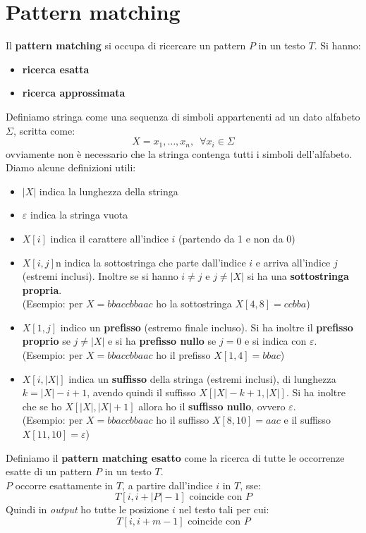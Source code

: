 \chapter{Pattern matching}
Il \textbf{pattern matching} si occupa di ricercare un pattern $P$ in un testo
$T$. Si hanno:
\begin{itemize}
  \item \textbf{ricerca esatta}
  \item \textbf{ricerca approssimata}
\end{itemize}
\begin{definizione}
  Definiamo stringa come una sequenza di simboli appartenenti ad un dato
  alfabeto $\Sigma$, scritta come:
  \[X=x_1,\ldots,x_n,\,\,\,\forall x_i\in \Sigma\]
  ovviamente non è necessario che la stringa contenga tutti i simboli
  dell'alfabeto.\\
  Diamo alcune definizioni utili:
  \begin{itemize}
    \item $|X|$ indica la lunghezza della stringa
    \item $\varepsilon$ indica la stringa vuota
    \item $X[i]$ indica il carattere all'indice $i$ (partendo da 1 e non da 0)
    \item $X[i,j]$n indica la sottostringa che parte dall'indice $i$ e arriva
    all'indice $j$ (estremi inclusi). Inoltre se si hanno $i\neq j$ e $j\neq
    |X|$ si ha una \textbf{sottostringa propria}.\\
    (Esempio: per $X=bbaccbbaac$ ho la sottostringa $X[4,8]=ccbba$)
    \item $X[1,j]$ indico un \textbf{prefisso} (estremo finale incluso). Si ha
    inoltre il \textbf{prefisso proprio} se $j\neq |X|$ e si ha \textbf{prefisso
      nullo} se $j=0$ e si indica con $\varepsilon$.\\
    (Esempio: per $X=bbaccbbaac$ ho il prefisso $X[1,4]=bbac$)
    \item $X[i,|X|]$ indica un \textbf{suffisso} della stringa (estremi
    inclusi), di lunghezza $k=|X|-i+1$, avendo quindi il suffisso
    $X[|X|-k+1,|X|]$. Si ha inoltre che se ho $X[|X|,|X|+1]$ 
    allora ho il \textbf{suffisso nullo}, ovvero $\varepsilon$.\\
    (Esempio: per $X=bbaccbbaac$ ho il suffisso $X[8,10]=aac$ e il suffisso
    $X[11,10]=\varepsilon$)
    
\end{itemize} 
\end{definizione}
\begin{definizione}
  Definiamo il \textbf{pattern matching esatto} come la ricerca di tutte le
  occorrenze esatte di un pattern $P$ in un testo $T$.\\
  $P$ occorre esattamente in $T$, a partire dall'indice $i$ in $T$, sse:
  \[T[i,i+|P|-1]\mbox{ coincide con }P\]
  Quindi in \textit{output} ho tutte le posizione $i$ nel testo tali per cui:
  \[T[i,i+m-1]\mbox{ coincide con }P\]
\end{definizione}
